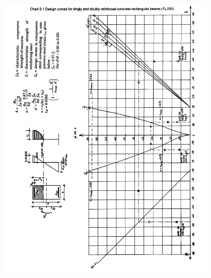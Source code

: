 \begin{figure}
\centering
\includegraphics[width=0.95\textwidth]{images/ch2-5.png}
\caption{}
\label{fig:Values for parameters}
\end{figure}
\newpage
